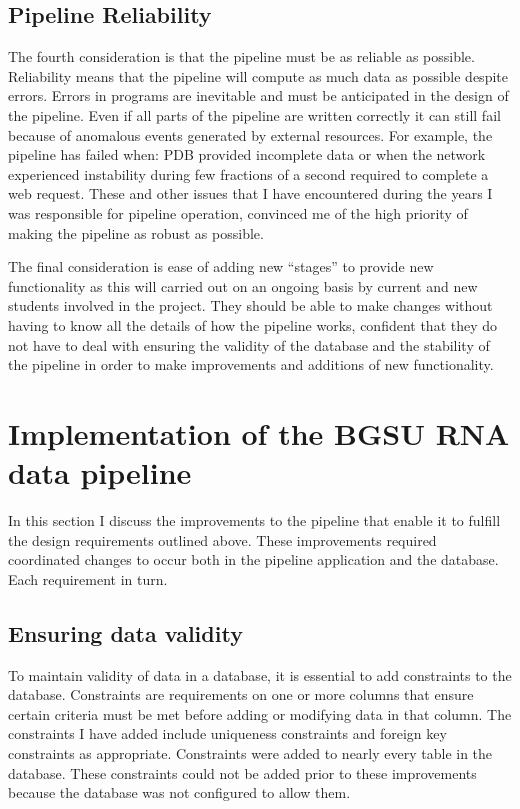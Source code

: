 \subsection{Pipeline Reliability}

The fourth consideration is that the pipeline must be as reliable as possible.
Reliability means that the pipeline will compute as much data as possible
despite errors. Errors in programs are inevitable and must be anticipated in the
design of the pipeline. Even if all parts of the pipeline are written correctly
it can still fail because of anomalous events generated by external resources.
For example, the pipeline has failed when:  PDB provided incomplete data or when
the network experienced instability during few fractions of a second required to
complete a web request. These and other issues that I have encountered during
the years I was responsible for pipeline operation, convinced me of the high
priority of making the pipeline as robust as possible.

The final consideration is ease of adding new ``stages'' to provide new
functionality as this will carried out on an ongoing basis by current and new
students involved in the project. They should be able to make changes without
having to know all the details of how the pipeline works, confident that they do
not have to deal with ensuring the validity of the database and the stability of
the pipeline in order to make improvements and additions of new functionality.

\section{Implementation of the BGSU RNA data pipeline}

In this section I discuss the improvements to the pipeline that enable it to
fulfill the design requirements outlined above. These improvements required
coordinated changes to occur both in the pipeline application and the database.
Each requirement in turn.

\subsection{Ensuring data validity}

To maintain validity of data in a database, it is essential to add constraints
to the database. Constraints are requirements on one or more columns that ensure
certain criteria must be met before adding or modifying data in that column. The
constraints I have added include uniqueness constraints and foreign key
constraints as appropriate. Constraints were added to  nearly every table in the
database. These constraints could not be added prior to these improvements
because the database was not configured to allow them.

